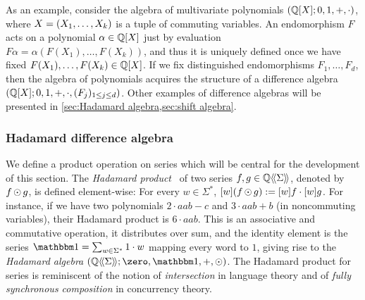 As an example, consider the algebra of multivariate polynomials
$(\mathbb Q[X]; 0, 1, {+}, {\cdot})$,
where $X = (X_1, \dots, X_k)$ is a tuple of commuting variables.
%
%
An endomorphism $F$ acts on a polynomial $\alpha \in \mathbb Q[X]$
just by evaluation $F \alpha = \alpha(F(X_1), \dots, F(X_k))$,
and thus it is uniquely defined once we have fixed $F(X_1), \dots, F(X_k) \in \mathbb Q[X]$.
%
%
If we fix distinguished endomorphisms $F_1, \dots, F_d$,
then the algebra of polynomials acquires the structure of a difference algebra
$(\mathbb Q[X]; 0, 1, {+}, {\cdot}, (F_j)_{1 \leq j \leq d})$.
%
Other examples of difference algebras will be presented in \cref{sec:Hadamard algebra,sec:shift algebra}.

\subsubsection{Hadamard difference algebra}
\label{sec:Hadamard algebra}

We define a product operation on series
which will be central for the development of this section.
%
The \emph{Hadamard product}~\cite{Fliess:1974} of two series $f, g \in \mathbb Q\langle\!\langle\Sigma\rangle\!\rangle$,
denoted by $f \operatorname{\odot} g$,
is defined element-wise:
For every $w \in \Sigma^*$,
$[w](f \operatorname{\odot} g) := [w]f \cdot [w]g$.
%
For instance, if we have two polynomials $2 \cdot aab - c$ and $3 \cdot aab + b$ (in noncommuting variables),
their Hadamard product is $6 \cdot aab$.
%
This is an associative and commutative operation, it distributes over sum,
and the identity element is the series $\one = \sum_{w\in \Sigma^*} 1 \cdot w$ mapping every word to $1$,
giving rise to the \emph{Hadamard algebra} $\tuple{\series \Q \Sigma; \zero, \one, {+}, {\hadamard}}$.
%
The Hadamard product for series is reminiscent of the notion of \emph{intersection} in language theory
and of \emph{fully synchronous composition} in concurrency theory.

